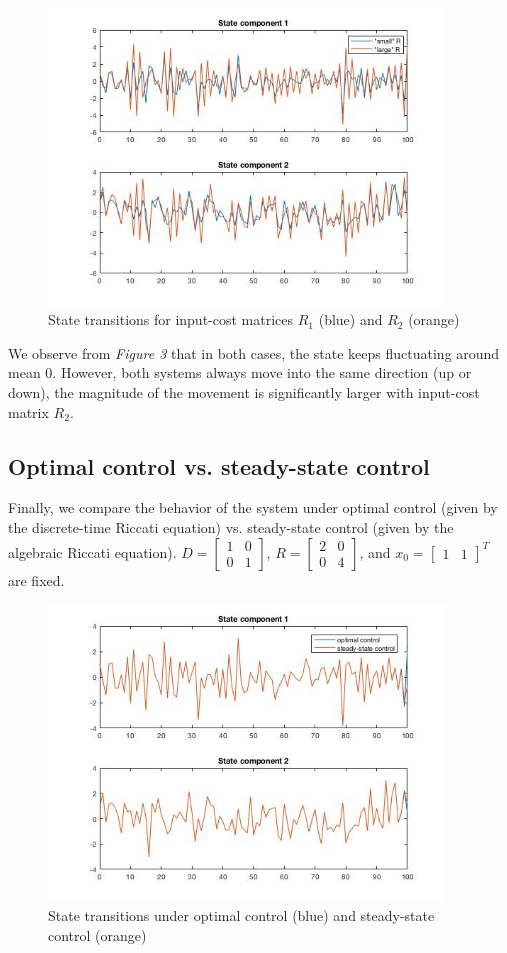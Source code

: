\documentclass[11pt, oneside]{article}   	%
\begin{document}
\begin{figure}[ht!]
\centering
\includegraphics[width=105mm]{../plots/iv.jpg}
\caption{State transitions for input-cost matrices $R_1$ (blue) and $R_2$ (orange)}
\end{figure}   

We observe from \textit{Figure 3} that in both cases, the state keeps fluctuating around mean 0. However, both systems always move into the same direction (up or down), the magnitude of the movement is significantly larger with input-cost matrix $R_2$.

\subsection{Optimal control vs. steady-state control}
Finally, we compare the behavior of the system under optimal control (given by the discrete-time Riccati equation) vs. steady-state control (given by the algebraic Riccati equation). $D = \begin{bmatrix} 1 & 0 \\[0.3em] 0 & 1\end{bmatrix}$, $R = \begin{bmatrix} 2 & 0 \\[0.3em] 0 & 4 \end{bmatrix}$, and $x_0 = \begin{bmatrix} 1 & 1 \end{bmatrix}^T$ are fixed. \\

\begin{figure}[ht!]
\centering
\includegraphics[width=105mm]{../plots/v.jpg}
\caption{State transitions under optimal control (blue) and steady-state control (orange)}
\end{figure}   
\end{document}
